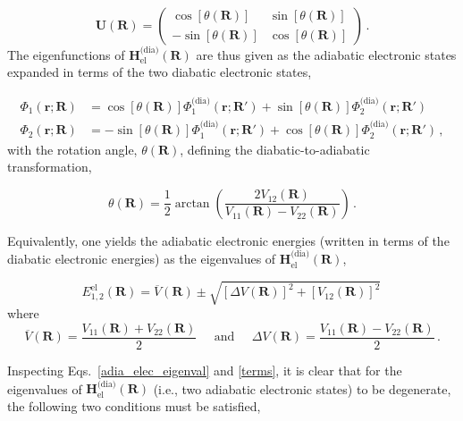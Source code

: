 \documentclass[9pt,bestpractices]{livecoms}
\newcommand{\R}{\mathbf{R}}
\newcommand{\Rprime}{\mathbf{R'}}
\newcommand{\re}{\mathbf{r}}
\begin{document}
\begin{equation}
\label{uni_trans_mat}
    \mathbf{U}(\R) = 
    \begin{pmatrix}
        \cos[\theta(\R)] & \sin[\theta(\R)] \\
        -\sin[\theta(\R)] & \cos[\theta(\R)]
    \end{pmatrix} \, .
\end{equation}
The eigenfunctions of $\mathbf{H}_{\text{el}}^{\text{(dia)}}(\R)$ are thus given as the adiabatic electronic states expanded in terms of the two diabatic electronic states, 

\begin{equation}
\label{adia_elec_eigenvec}
\begin{split}
    \Phi_1(\re;\R) &= \cos[\theta(\R)] \Phi_1^{\text{(dia)}}(\re; \Rprime) + \sin[\theta(\R)] \Phi_2^{\text{(dia)}}(\re; \Rprime)\\
    \Phi_2(\re;\R) &= -\sin[\theta(\R)] \Phi_1^{\text{(dia)}}(\re; \Rprime) + \cos[\theta(\R)] \Phi_2^{\text{(dia)}}(\re; \Rprime) \, ,
\end{split}
\end{equation}
with the rotation angle, $\theta(\R)$, defining the diabatic-to-adiabatic transformation,

\begin{equation}
\label{mix_ang}
    \theta(\R) = \frac{1}{2} \arctan \left(\frac{2V_{12}(\R)}{V_{11}(\R) - V_{22}(\R)}\right) \, .
\end{equation}

Equivalently, one yields the adiabatic electronic energies (written in terms of the diabatic electronic energies) as the eigenvalues of $\mathbf{H}_{\text{el}}^{\text{(dia)}}(\R)$,\cite{atchity_potential_1991, domcke_conical_2004}

\begin{equation}
\label{adia_elec_eigenval}
    E_{1,2}^{\text{el}}(\R) = \overline{V}(\R) \pm \sqrt{\left[\Delta V(\R)\right]^2 + \left[V_{12}(\R)\right]^2} \,
\end{equation}
where
\begin{equation}
\label{terms}
    \overline{V}(\R) = \frac{V_{11}(\R) + V_{22}(\R)}{2} \;\;\;\;\; \text{and} \;\;\;\;\; \Delta V(\R) = \frac{V_{11}(\R) - V_{22}(\R)}{2} \, .
\end{equation}

Inspecting Eqs.~\eqref{adia_elec_eigenval} and \eqref{terms}, it is clear that for the eigenvalues of $\mathbf{H}_{\text{el}}^{\text{(dia)}}(\R)$ (i.e., two adiabatic electronic states) to be degenerate, the following two conditions must be satisfied,
\end{document}
